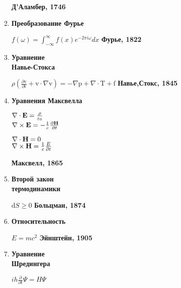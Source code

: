 \documentclass[12pt]{article}
\begin{document}
\begin{enumerate}
\begin{minipage}[t]{100mm}
			\hfill \bf{Д'Аламбер, 1746} \end{minipage}
		\item \bf{Преобразование Фурье} \hfill \begin{minipage}[t]{100mm}$ f(\omega) = {\int_{-\infty}^{\infty}} f\left(x \right) {e}^{-2\pi i \omega} dx $  \hfill \bf{Фурье, 1822} \end{minipage}
		\item 
		\begin{minipage}[t]{45mm} \bf{Уравнение \\Навье-Стокса\\}
		\end{minipage}
		\hfill
		\begin{minipage}[t]{100mm}$ \rho(\frac{\partial \mathrm{v}}{\partial \mathrm{t}}+\mathrm{v} \cdot \nabla \mathrm{v}) = - \nabla \mathrm{p} + \nabla \cdot \mathrm{T} + \mathrm{f}   $ \hfill \bf{Навье,Стокс, 1845}
		\end{minipage}
		\item \bf{Уравнения Максвелла} \hfill \begin{minipage}[t]{100mm}  \begin{minipage}[t]{30mm}  $\nabla\cdot{\bf E} =   \frac{\rho}{\varepsilon_0}$ \\ $\nabla\times{\bf E} = -\frac{1}{c} \frac{\partial{\bf H}}{\partial t}$ \\ \end{minipage}
			\begin{minipage}[t]{30mm} $\nabla\cdot{\bf H} = 0$ \\$\nabla\times{\bf H} = \frac{1}{c} \frac {E}{\partial t}$ \\
			\end{minipage}  \hfill \bf{Максвелл, 1865}\end{minipage}
		\item \begin{minipage}[t]{45mm} \bf{Второй закон \\термодинамики\\} \end{minipage}
		\hfill
		\begin{minipage}[t]{100mm}  $\mathrm{d}S\ge 0 $ \hfill \bf{Больцман, 1874} \end{minipage}
		\item \bf{Относительность} \hfill \begin{minipage}[t]{100mm}$ E=mc^2 $ \hfill \bf{Эйнштейн, 1905}
		\end{minipage}
		\item\begin{minipage}[t]{45mm} \bf{Уравнение \\Шредингера\\} \end{minipage}  \hfill \begin{minipage}[t]{100mm} $ ih \frac{\partial}{\partial t} \Psi = H \Psi $

\end{minipage}
\end{enumerate}
\end{document}
